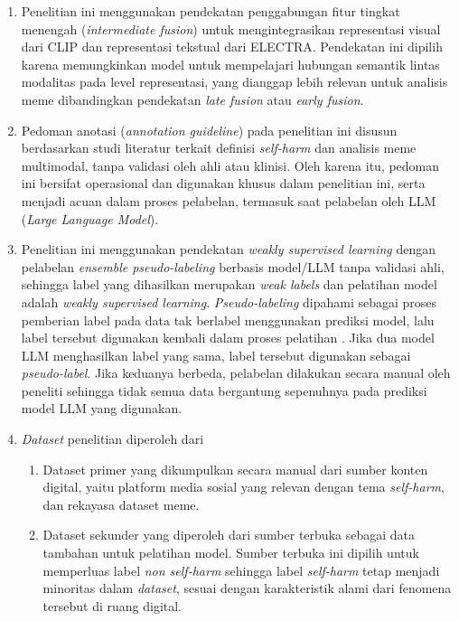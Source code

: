 \begin{enumerate}
    \item Penelitian ini menggunakan pendekatan penggabungan fitur tingkat menengah (\textit{intermediate fusion}) untuk mengintegrasikan representasi visual dari CLIP dan representasi tekstual dari ELECTRA. Pendekatan ini dipilih karena memungkinkan model untuk mempelajari hubungan semantik lintas modalitas pada level representasi, yang dianggap lebih relevan untuk analisis meme dibandingkan pendekatan \textit{late fusion} atau \textit{early fusion}.
    
    \item Pedoman anotasi (\textit{annotation guideline}) pada penelitian ini disusun berdasarkan studi literatur terkait definisi \textit{self-harm} dan analisis meme multimodal, tanpa validasi oleh ahli atau klinisi. Oleh karena itu, pedoman ini bersifat operasional dan digunakan khusus dalam penelitian ini, serta menjadi acuan dalam proses pelabelan, termasuk saat pelabelan oleh LLM (\textit{Large Language Model}).
    
    \item Penelitian ini menggunakan pendekatan \textit{weakly supervised learning} dengan pelabelan \textit{ensemble pseudo-labeling} berbasis model/LLM tanpa validasi ahli, sehingga label yang dihasilkan merupakan \textit{weak labels} dan pelatihan model adalah \textit{weakly supervised learning}. \textit{Pseudo-labeling} dipahami sebagai proses pemberian label pada data tak berlabel menggunakan prediksi model, lalu label tersebut digunakan kembali dalam proses pelatihan \cite{lee2013pseudo}. Jika dua model LLM menghasilkan label yang sama, label tersebut digunakan sebagai \textit{pseudo-label}. Jika keduanya berbeda, pelabelan dilakukan secara manual oleh peneliti sehingga tidak semua data bergantung sepenuhnya pada prediksi model LLM yang digunakan. 

    \item \textit{Dataset} penelitian diperoleh dari 
    \begin{enumerate}
        \item Dataset primer yang dikumpulkan secara manual dari sumber konten digital, yaitu platform media sosial yang relevan dengan tema \textit{self-harm}, dan rekayasa dataset meme.
        \item Dataset sekunder yang diperoleh dari sumber terbuka sebagai data tambahan untuk pelatihan model. Sumber terbuka ini dipilih untuk memperluas label \textit{non self-harm} sehingga label \textit{self-harm} tetap menjadi minoritas dalam \textit{dataset}, sesuai dengan karakteristik alami dari fenomena tersebut di ruang digital.
    \end{enumerate}


\end{enumerate}
